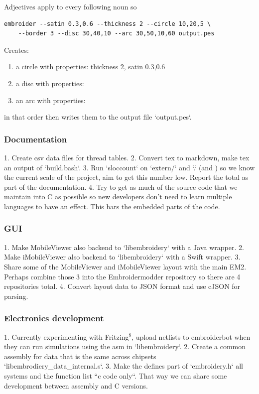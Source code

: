 \documentclass[a4paper, 11pt]{report}
\begin{document}
Adjectives apply to every following noun so

\begin{verbatim}
embroider --satin 0.3,0.6 --thickness 2 --circle 10,20,5 \
    --border 3 --disc 30,40,10 --arc 30,50,10,60 output.pes
\end{verbatim}

Creates:

\begin{enumerate}
\item a circle with properties: thickness 2, satin 0.3,0.6
\item a disc with properties: 
\item an arc with properties:
\end{enumerate}

in that order then writes them to the output file `output.pes`.

\subsubsection{Documentation}

1. Create csv data files for thread tables.
2. Convert tex to markdown, make tex an output of `build.bash`.
3. Run `sloccount` on `extern/` and `.` (and ) so we know the current scale
   of the project, aim to get this number low. Report the total as part of
   the documentation.
4. Try to get as much of the source code that we maintain into C as possible
   so new developers don't need to learn multiple languages to have an effect.
   This bars the embedded parts of the code. 

\subsubsection{GUI}

1. Make MobileViewer also backend to `libembroidery` with a Java wrapper.
2. Make iMobileViewer also backend to `libembroidery` with a Swift wrapper.
3. Share some of the MobileViewer and iMobileViewer layout with the main
   EM2. Perhaps combine those 3 into the Embroidermodder repository so there
   are 4 repositories total.
4. Convert layout data to JSON format and use cJSON for parsing.

\subsubsection{Electronics development}

1. Currently experimenting with Fritzing$^{8}$, upload netlists to embroiderbot
   when they can run simulations using the asm in `libembroidery`.
2. Create a common assembly for data that is the same across chipsets
   `libembrodiery\_data\_internal.s`.
3. Make the defines part of `embroidery.h` all systems and the function list
   ``c code only``. That way we can share some development between assembly and C
   versions.
\end{document}
